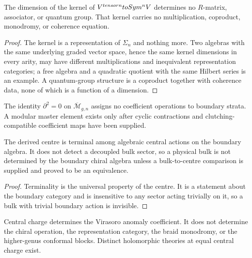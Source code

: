 \begin{theorem}
\label{nogo:dimension-loss-spine}
The dimension of the kernel of $V^{tensor n}toSym^nV$ determines no
$R$-matrix, associator, or quantum group. That kernel carries no
multiplication, coproduct, monodromy, or coherence equation.
\end{theorem}
\begin{proof}
The kernel is a representation of $\Sigma_n$ and nothing more. Two algebras
with the same underlying graded vector space, hence the same kernel dimensions
in every arity, may have different multiplications and inequivalent
representation categories; a free algebra and a quadratic quotient with the
same Hilbert series is an example. A quantum-group structure is a coproduct
together with coherence data, none of which is a function of a dimension.
\end{proof}

\begin{theorem}
The identity $\partial^2=0$ on $\overline{\mathcal M}_{g,n}$ assigns no
coefficient operations to boundary strata. A modular master element exists only
after cyclic contractions and clutching-compatible coefficient maps have been
supplied.
\end{theorem}

\begin{theorem}
The derived centre is terminal among algebraic central actions on the boundary
algebra. It does not detect a decoupled bulk sector, so a physical bulk is not
determined by the boundary chiral algebra unless a bulk-to-centre comparison is
supplied and proved to be an equivalence.
\end{theorem}
\begin{proof}
Terminality is the universal property of the centre. It is a statement about
the boundary category and is insensitive to any sector acting trivially on it,
so a bulk with trivial boundary action is invisible.
\end{proof}

\begin{theorem}
Central charge determines the Virasoro anomaly coefficient. It does not
determine the chiral operation, the representation category, the braid
monodromy, or the higher-genus conformal blocks. Distinct holomorphic theories
at equal central charge exist.
\end{theorem}

